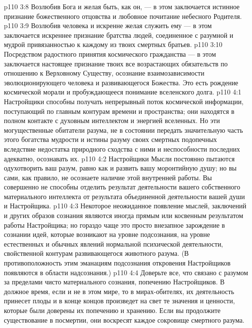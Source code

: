\vs p110 3:8 \pc {}\bibnobreakspace Возлюбив Бога и желая быть, как он, --- в этом заключается истинное признание божественного отцовства и любовное почитание небесного Родителя.
\vs p110 3:9 \pc {}\bibnobreakspace Возлюбив человека и искренне желая служить ему --- в этом заключается искреннее признание братства людей, соединенное с разумной и мудрой привязанностью к каждому из твоих смертных братьев.
\vs p110 3:10 \pc {}\bibnobreakspace Посредством радостного принятия космического гражданства --- в этом заключается настоящее признание твоих все возрастающих обязательств по отношению к Верховному Существу, осознание взаимозависимости эволюционирующего человека и развивающегося Божества. Это есть рождение космической морали и пробуждающееся понимание вселенского долга.
\vs p110 4:1 Настройщики способны получать непрерывный поток космической информации, поступающий по главным контурам времени и пространства; они находятся в полном контакте с духовным интеллектом и энергией вселенных. Но эти могущественные обитатели разума, не в состоянии передать значительную часть этого богатства мудрости и истины разуму своих смертных подопечных вследствие недостатка природного сходства с ними и неспособности последних адекватно, осознавать их.
\vs p110 4:2 Настройщики Мысли постоянно пытаются одухотворить ваш разум, равно как и развить вашу моронтийную душу; но вы сами, как правило, не осознаете наличие этой внутренней работы. Вы совершенно не способны отделить результат деятельности вашего собственного материального интеллекта от результата объединенной деятельности вашей души и Настройщика.
\vs p110 4:3 Некоторое неожиданное появление мыслей, заключений и других образов сознания являются иногда прямым или косвенным результатом работы Настройщика; но гораздо чаще это просто внезапное зарождение в сознании идей, которые возникают на уровне подсознания, на уровне естественных и обычных явлений нормальной психической деятельности, свойственной контурам развивающегося животного разума. (В противоположность этим эманациям подсознания откровения Настройщиков появляются в области надсознания.)
\vs p110 4:4 Доверьте все, что связано с разумом за пределами чисто материального сознания, попечению Настройщиков. В должное время, если и не в этом мире, то в мирах\hyp{}обителях, их деятельность принесет плоды и в конце концов произведет на свет те значения и ценности, которые были доверены их попечению и хранению. Если вы продолжите существование в посмертии, они воскресят каждое сокровище смертного разума.
